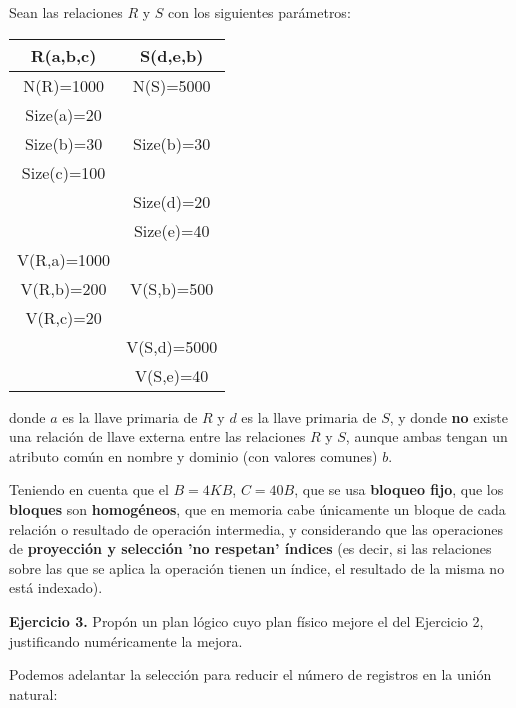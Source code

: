 \documentclass[12pt]{report}
\begin{document}
Sean las relaciones $R$ y $S$ con los siguientes parámetros:

\begin{center}
\begin{tabular}{|c|c|}
\hline 
R(a,b,c) & S(d,e,b) \\ 
\hline 
N(R)=1000 & N(S)=5000 \\ 
\hline 
Size(a)=20 &   \\ 
\hline 
Size(b)=30 & Size(b)=30 \\ 
\hline 
Size(c)=100 &   \\ 
\hline 
  & Size(d)=20 \\ 
\hline 
  & Size(e)=40 \\ 
\hline 
V(R,a)=1000 &   \\ 
\hline 
V(R,b)=200 & V(S,b)=500 \\ 
\hline 
V(R,c)=20 &   \\ 
\hline 
  & V(S,d)=5000 \\ 
\hline 
  & V(S,e)=40 \\ 
\hline 
\end{tabular} 
\end{center}
donde $a$ es la llave primaria de $R$ y $d$ es la llave primaria de $S$, y donde \textbf{no} existe una relación de llave externa entre las relaciones $R$ y $S$, aunque ambas tengan un atributo común en nombre y dominio (con valores comunes) $b$.

Teniendo en cuenta que el $B=4KB$, $C=40B$, que se usa \textbf{bloqueo fijo}, que los \textbf{bloques} son \textbf{homogéneos}, que en memoria cabe únicamente un bloque de cada relación o resultado de operación intermedia, y considerando que las operaciones de \textbf{proyección y selección 'no respetan' índices} (es decir, si las relaciones sobre las que se aplica la operación tienen un índice, el resultado de la misma no está indexado).

\textbf{Ejercicio 3.} Propón un plan lógico cuyo plan físico mejore el del Ejercicio 2, justificando numéricamente la mejora.

Podemos adelantar la selección para reducir el número de registros en la unión natural:

\begin{center}
\end{center}
\end{document}
